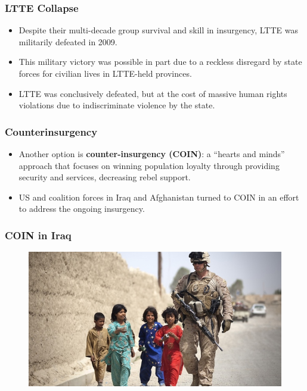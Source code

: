 \documentclass{beamer}
\begin{document}
\begin{frame} 
	\frametitle{\LARGE{LTTE Collapse}}
	\begin{itemize}
		\item Despite their multi-decade group survival and skill in insurgency, LTTE was militarily defeated in 2009. \pause
		\item This military victory was possible in part due to a reckless disregard by state forces for civilian lives in LTTE-held provinces. \pause
		\item LTTE was conclusively defeated, but at the cost of massive human rights violations due to indiscriminate violence by the state.
	\end{itemize}
\end{frame}

\begin{frame} 
	\frametitle{\LARGE{Counterinsurgency}}
	\begin{itemize}
		\item Another option is \textbf{counter-insurgency (COIN)}: a ``hearts and minds'' approach that focuses on winning population loyalty through providing security and services, decreasing rebel support. \pause
		\item US and coalition forces in Iraq and Afghanistan turned to COIN in an effort to address the ongoing insurgency. \pause
	\end{itemize}
\end{frame}

\begin{frame} 
	\frametitle{\LARGE{COIN in Iraq}}
	\begin{figure}[ht!]
		\centering
		\includegraphics[width=\textwidth,height=\textheight,keepaspectratio]{COIN.jpg}
	\end{figure}
\end{frame}
\end{document}
